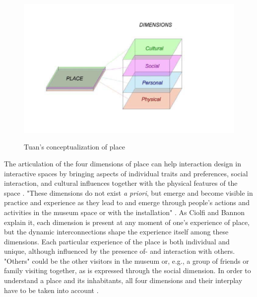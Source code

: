 \begin{figure}[H]
\centering 
\includegraphics[width=12.5cm]{pictures/Theory/tuans_dimensions.png}
\caption{Tuan's conceptualization of place}
\autocite[p. 224]{ciolfi_space_2005}
\centering
\end{figure}

The articulation of the four dimensions of place can help interaction design in interactive spaces by bringing aspects of individual traits and preferences, social interaction, and cultural influences together with the physical features of the space \autocite[p. 163]{hybridplace_ciolfi}. "These dimensions do not exist \emph{a priori}, but emerge and become visible in practice and experience as they lead to and emerge through people's actions and activities in the museum space or with the installation" \autocite[p. 163]{hybridplace_ciolfi}. As Ciolfi and Bannon explain it, each dimension is present at any moment of one's experience of place, but the dynamic interconnections shape the experience itself among these dimensions. Each particular experience of the place is both individual and unique, although influenced by the presence of- and interaction with others. "Others" could be the other visitors in the museum or, e.g., a group of friends or family visiting together, as is expressed through the social dimension. In order to understand a place and its inhabitants, all four dimensions and their interplay have to be taken into account \autocite[p. 162]{hybridplace_ciolfi}.

